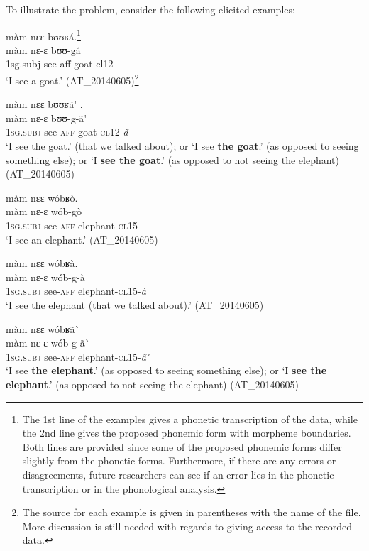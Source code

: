 \documentclass[output=paper]{langsci/langscibook}
\begin{document}
To illustrate the problem, consider the following elicited examples:

\ea\label{ex:teo:1}
%
 màm nɛɛ bʊʊʁá.\footnote{The 1st line of the examples gives a phonetic transcription of the data, while the 2nd line gives the proposed phonemic form with morpheme boundaries. Both lines are provided since some of the proposed phonemic forms differ slightly from the phonetic forms. Furthermore, if there are any errors or disagreements, future researchers can see if an error lies in the phonetic transcription or in the phonological analysis.}\\
\gll màm nɛ-ɛ bʊʊ-gá\\
1sg.subj see-aff goat-cl12  \\
\glt ‘I see a goat.’ (AT\_20140605)\footnote{The source for each example is given in parentheses with the name of the file. More discussion is still needed with regards to giving access to the recorded data.}
\z

\ea\label{ex:teo:2}
 màm nɛɛ bʊʊʁã\'{} .\\
\gll màm nɛ-ɛ bʊʊ-g-ã\'{} \\
\textsc{1sg}.\textsc{subj} see-\textsc{aff} goat-\textsc{cl12}-\textit{ã}\\
\glt ‘I see the goat.’ (that we talked about); or ‘I see \textbf{the goat}.’ (as opposed to seeing something else); or ‘I \textbf{see the goat}.’ (as opposed to not seeing the elephant) (AT\_20140605)
\z

\ea\label{ex:teo:3} màm nɛɛ wóbʁò.\\
\gll màm nɛ-ɛ wób-gò\\
\textsc{1sg.subj} see-\textsc{aff} elephant-\textsc{cl15}\\
\glt  ‘I see an elephant.’ (AT\_20140605)
\z

\ea\label{ex:teo:4}
 màm nɛɛ wóbʁà.\\
\gll màm nɛ-ɛ wób-g-à\\
\textsc{1sg.subj} see-\textsc{aff} elephant-\textsc{cl15-}\textit{à} \\
\glt ‘I see the elephant (that we talked about).’ (AT\_20140605)
\z

\ea\label{ex:teo:5}
 màm nɛɛ wóbʁã\`{} \\
\gll màm nɛ-ɛ wób-g-ã\`{} \\
\textsc{1sg.subj} see-\textsc{aff} elephant-\textsc{cl15-}\textit{ã\'{}} \\
\glt ‘I see \textbf{the elephant}.’ (as opposed to seeing something else); or ‘I \textbf{see the elephant}.’ (as opposed to not seeing the elephant) (AT\_20140605)
\z
\end{document}
